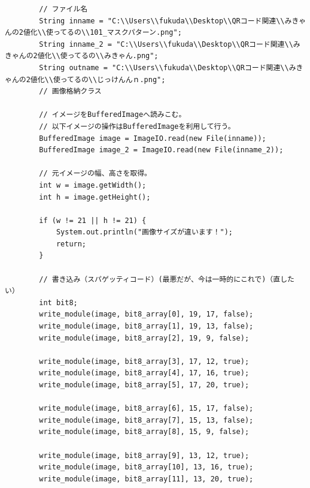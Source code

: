 \documentclass{thesis}
\begin{document}
\begin{lstlisting}
		// ファイル名
		String inname = "C:\\Users\\fukuda\\Desktop\\QRコード関連\\みきゃんの2値化\\使ってるの\\101_マスクパターン.png";
		String inname_2 = "C:\\Users\\fukuda\\Desktop\\QRコード関連\\みきゃんの2値化\\使ってるの\\みきゃん.png";
		String outname = "C:\\Users\\fukuda\\Desktop\\QRコード関連\\みきゃんの2値化\\使ってるの\\じっけんんｎ.png";
		// 画像格納クラス

		// イメージをBufferedImageへ読みこむ。
		// 以下イメージの操作はBufferedImageを利用して行う。
		BufferedImage image = ImageIO.read(new File(inname));
		BufferedImage image_2 = ImageIO.read(new File(inname_2));

		// 元イメージの幅、高さを取得。
		int w = image.getWidth();
		int h = image.getHeight();

		if (w != 21 || h != 21) {
			System.out.println("画像サイズが違います！");
			return;
		}

		// 書き込み（スパゲッティコード）(最悪だが、今は一時的にこれで)（直したい）
		int bit8;
		write_module(image, bit8_array[0], 19, 17, false);
		write_module(image, bit8_array[1], 19, 13, false);
		write_module(image, bit8_array[2], 19, 9, false);

		write_module(image, bit8_array[3], 17, 12, true);
		write_module(image, bit8_array[4], 17, 16, true);
		write_module(image, bit8_array[5], 17, 20, true);

		write_module(image, bit8_array[6], 15, 17, false);
		write_module(image, bit8_array[7], 15, 13, false);
		write_module(image, bit8_array[8], 15, 9, false);

		write_module(image, bit8_array[9], 13, 12, true);
		write_module(image, bit8_array[10], 13, 16, true);
		write_module(image, bit8_array[11], 13, 20, true);


\end{lstlisting}
\end{document}
